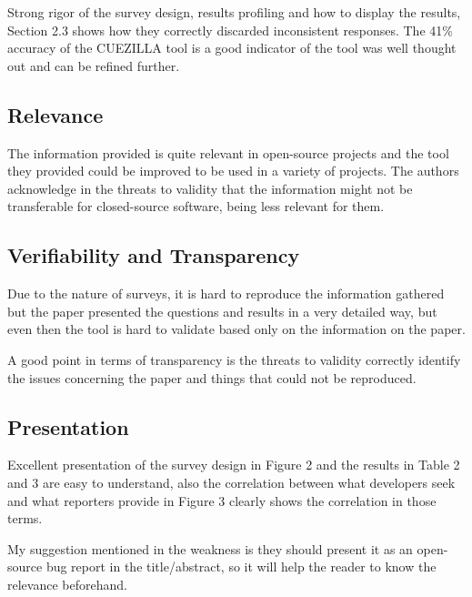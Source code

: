 \documentclass[11pt]{article}
\begin{document}
Strong rigor of the survey design, results profiling and how to display the results, Section 2.3 shows how they correctly discarded inconsistent responses. The 41\% accuracy of the CUEZILLA tool is a good indicator of the tool was well thought out and can be refined further.

\subsection{Relevance}

The information provided is quite relevant in open-source projects and the tool they provided could be improved to be used in a variety of projects. The authors acknowledge in the threats to validity that the information might not be transferable for closed-source software, being less relevant for them.

\subsection{Verifiability and Transparency}

Due to the nature of surveys, it is hard to reproduce the information gathered but the paper presented the questions and results in a very detailed way, but even then the tool is hard to validate based only on the information on the paper.

A good point in terms of transparency is the threats to validity correctly identify the issues concerning the paper and things that could not be reproduced.

\subsection{Presentation}

Excellent presentation of the survey design in Figure 2 and the results in Table 2 and 3 are easy to understand, also the correlation between what developers seek and what reporters provide in Figure 3 clearly shows the correlation in those terms.

My suggestion mentioned in the weakness is they should present it as an open-source bug report in the title/abstract, so it will help the reader to know the relevance beforehand.
\end{document}
